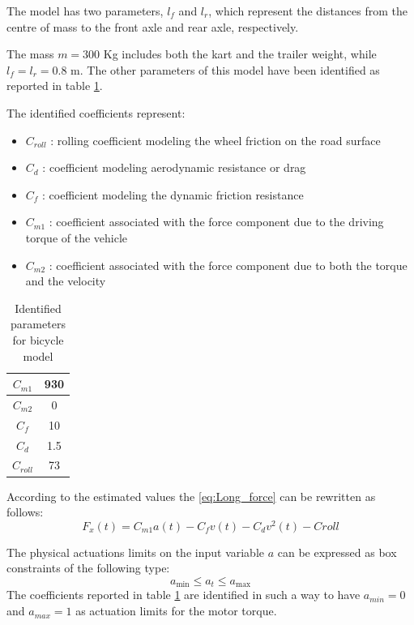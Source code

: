 \documentclass[a4paper,12pt,oneside]{book}
\begin{document}
\bigskip
The model has two parameters, $l_f$ and $l_r$, which represent the distances from the centre of mass to the front axle and rear axle, respectively.

The mass $m = 300$ Kg includes both the kart and the trailer weight, while $l_f = l_r = 0.8$ m.
The other parameters of this model have been identified as reported in table \ref{tab:Parameters}.


\bigskip
The identified coefficients represent:
\begin{itemize}
    \item $C_{roll}$ : rolling coefficient modeling the wheel friction on the road surface
    \item $C_d$ : coefficient modeling aerodynamic resistance or drag
    \item $C_f$ : coefficient modeling the dynamic friction resistance
    \item $C_{m1}$ : coefficient associated with the force component due to the driving torque of the vehicle
    \item $C_{m2}$ : coefficient associated with the force component due to both the torque and the velocity
\end{itemize}

\begin{table}[h!]
    \centering
    \begin{tabular}{|c|c|}
        \hline
        $C_{m1}$ & 930 \\
        \hline
        $C_{m2}$ & 0 \\
        \hline
        $C_f$ & 10 \\
        \hline
        $C_d$ & 1.5 \\
        \hline
        $C_{roll}$ & 73 \\
        \hline
    \end{tabular}
    \caption{Identified parameters for bicycle model}
    \label{tab:Parameters}
\end{table}

According to the estimated values the \ref{eq:Long_force} can be rewritten as follows:
\begin{equation}
    F_x(t) = C_{m1} a(t) - C_f v(t) - C_d v^2(t) - Croll
\end{equation}

The physical actuations limits on the input variable $a$ can be expressed as box constraints of the following type:
\begin{equation}
    a_{\text{min}} \leq a_t \leq a_{\text{max}}
\label{Input_limits}
\end{equation}
The coefficients reported in table \ref{tab:Parameters} are identified in such a way to have $a_{min} = 0$ and $a_{max} = 1$ as actuation limits for the motor torque.
\end{document}

